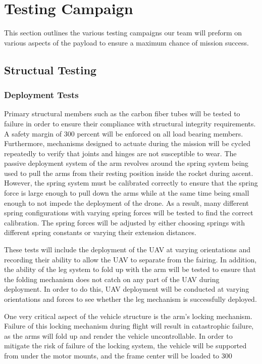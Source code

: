 \chapter{Testing Campaign}

	This section outlines the various testing campaigns our team will preform on various aspects of the payload to ensure a maximum chance of mission success.

\section{Structual Testing}\label{PL:Testing:Structural}
	\subsection{Deployment Tests}
	Primary structural members such as the carbon fiber tubes will be tested to failure in order to ensure their compliance with structural integrity requirements. A safety margin of 300 percent will be enforced on all load bearing members. Furthermore, mechanisms designed to actuate during the mission will be cycled repeatedly to verify that joints and hinges are not susceptible to wear. The passive deployment system of the arm revolves around the spring system being used to pull the arms from their resting position inside the rocket during ascent. However, the spring system must be calibrated correctly to ensure that the spring force is large enough to pull down  the arms while at the same time being small enough to not impede the deployment of the drone. As a result, many different spring configurations with varying spring forces will be tested to find the correct calibration. The spring forces will be adjusted by either choosing springs with different spring constants or varying their extension distances. 

	These tests will include the deployment of the UAV at varying orientations and recording their ability to allow the UAV to separate from the fairing. In addition, the ability of the leg system to fold up with the arm will be tested to ensure that the folding mechanism does not catch on any part of the UAV during deployment. In order to do this, UAV deployment will be conducted at varying orientations and forces to see whether the leg mechanism is successfully deployed.
	
	One very critical aspect of the vehicle structure is the arm’s locking mechanism. Failure of this locking mechanism during flight will result in catastrophic failure, as the arms will fold up and render the vehicle uncontrollable. In order to mitigate the risk of failure of the locking system, the vehicle will be supported from under the motor mounts, and the frame center will be loaded to 300%
	

